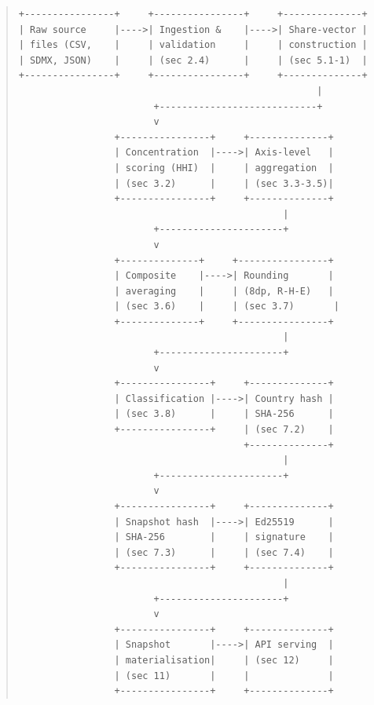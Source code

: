 \begin{quote}\ttfamily\small
\begin{verbatim}
+----------------+     +----------------+     +--------------+
| Raw source     |---->| Ingestion &    |---->| Share-vector |
| files (CSV,    |     | validation     |     | construction |
| SDMX, JSON)    |     | (sec 2.4)      |     | (sec 5.1-1)  |
+----------------+     +----------------+     +--------------+
                                                     |
                        +----------------------------+
                        v
                 +----------------+     +--------------+
                 | Concentration  |---->| Axis-level   |
                 | scoring (HHI)  |     | aggregation  |
                 | (sec 3.2)      |     | (sec 3.3-3.5)|
                 +----------------+     +--------------+
                                               |
                        +----------------------+
                        v
                 +--------------+     +----------------+
                 | Composite    |---->| Rounding       |
                 | averaging    |     | (8dp, R-H-E)   |
                 | (sec 3.6)    |     | (sec 3.7)       |
                 +--------------+     +----------------+
                                               |
                        +----------------------+
                        v
                 +----------------+     +--------------+
                 | Classification |---->| Country hash |
                 | (sec 3.8)      |     | SHA-256      |
                 +----------------+     | (sec 7.2)    |
                                        +--------------+
                                               |
                        +----------------------+
                        v
                 +----------------+     +--------------+
                 | Snapshot hash  |---->| Ed25519      |
                 | SHA-256        |     | signature    |
                 | (sec 7.3)      |     | (sec 7.4)    |
                 +----------------+     +--------------+
                                               |
                        +----------------------+
                        v
                 +----------------+     +--------------+
                 | Snapshot       |---->| API serving  |
                 | materialisation|     | (sec 12)     |
                 | (sec 11)       |     |              |
                 +----------------+     +--------------+
\end{verbatim}
\end{quote}

